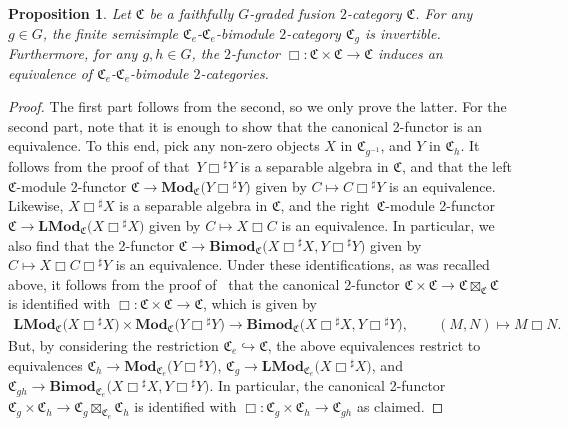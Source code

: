 \documentclass[10pt,a4paper]{amsart}
\newtheorem{Proposition}[Theorem]{Proposition}
{ \theoremstyle{definition}
\newtheorem{Definition}[Theorem]{Definition}
\newtheorem{Note}[Theorem]{Note}
\newtheorem{Construction}[Theorem]{Construction}
\newtheorem{Example}[Theorem]{Example}
\newtheorem{Remark}[Theorem]{Remark} }
\numberwithin{equation}{section}
\begin{document}
\begin{Proposition}\label{prop:gradedMoritaequivalence}
Let $\mathfrak{C}$ be a faithfully $G$-graded fusion $2$-category $\mathfrak{C}$. For any $g\in G$, the finite semisimple $\mathfrak{C}_e$-$\mathfrak{C}_e$-bimodule $2$-category $\mathfrak{C}_g$ is invertible. Furthermore, for any $g,h\in G$, the $2$-functor $\Box\colon\mathfrak{C}\times\mathfrak{C}\rightarrow \mathfrak{C}$ induces an equivalence  of $\mathfrak{C}_e$-$\mathfrak{C}_e$-bimodule $2$-categories.
\end{Proposition}
\begin{proof}
The first part follows from the second, so we only prove the latter. For the second part, note that it is enough to show that the canonical 2-functor is an equivalence. To this end, pick any non-zero objects $X$ in $\mathfrak{C}_{g^{-1}}$, and $Y$ in $\mathfrak{C}_{h}$. It follows from the proof of \cite[Theorem~5.4.3]{D8} that~$Y\Box {^{\sharp}Y}$ is a separable algebra in $\mathfrak{C}$, and that the left $\mathfrak{C}$-module 2-functor $\mathfrak{C}\rightarrow \mathbf{Mod}_{\mathfrak{C}}\big(Y\Box {^{\sharp}Y}\big)$ given by $C\mapsto C\Box {^{\sharp}Y}$ is an equivalence. Likewise, $X\Box {^{\sharp}X}$ is a separable algebra in $\mathfrak{C}$, and the right~$\mathfrak{C}$-module 2-functor $\mathfrak{C}\rightarrow \mathbf{LMod}_{\mathfrak{C}}\big(X\Box {^{\sharp}X}\big)$ given by $C\mapsto X\Box C$ is an equivalence. In particular, we also find that the 2-functor $\mathfrak{C}\rightarrow \mathbf{Bimod}_{\mathfrak{C}}\big(X\Box {^{\sharp}X},Y\Box {^{\sharp}Y}\big)$ given by $C\mapsto X\Box C\Box {^{\sharp}Y}$ is an equivalence. Under these identifications, as was recalled above, it follows from the proof of~\cite[Theorem~2.2.4]{D10} that the canonical 2-functor $\mathfrak{C}\times\mathfrak{C}\rightarrow\mathfrak{C}\boxtimes_{\mathfrak{C}}\mathfrak{C}$ is identified with $\Box\colon\mathfrak{C}\times\mathfrak{C}\rightarrow \mathfrak{C}$, which is given by
\begin{gather*}
 \mathbf{LMod}_{\mathfrak{C}}\big(X\Box {^{\sharp}X}\big)\times\mathbf{Mod}_{\mathfrak{C}}\big(Y\Box {^{\sharp}Y}\big) \rightarrow \mathbf{Bimod}_{\mathfrak{C}}\big(X\Box {^{\sharp}X},Y\Box {^{\sharp}Y}\big),\qquad
(M,N) \mapsto M\Box N.
\end{gather*}
 But, by considering the restriction $\mathfrak{C}_e\hookrightarrow\mathfrak{C}$, the above equivalences restrict to equivalences $\mathfrak{C}_h\rightarrow \mathbf{Mod}_{\mathfrak{C}_e}\big(Y\Box {^{\sharp}Y}\big)$, $\mathfrak{C}_g\rightarrow \mathbf{LMod}_{\mathfrak{C}_e}\big(X\Box {^{\sharp}X}\big)$, and $\mathfrak{C}_{gh}\rightarrow \mathbf{Bimod}_{\mathfrak{C}_e}\big(X\Box {^{\sharp}X},Y\Box {^{\sharp}Y}\big)$. In particular, the canonical 2-functor $\mathfrak{C}_g\times\mathfrak{C}_h\rightarrow\mathfrak{C}_g\boxtimes_{\mathfrak{C}_e}\mathfrak{C}_h$ is identified with $\Box:\mathfrak{C}_g\times\mathfrak{C}_h\rightarrow\mathfrak{C}_{gh}$ as claimed.
\end{proof}
\end{document}
